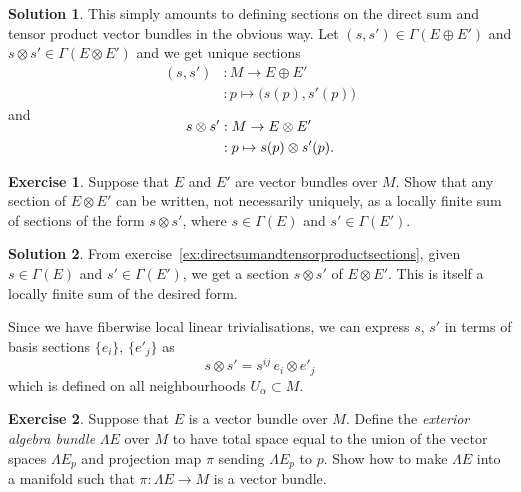 \documentclass[11pt, a4paper]{report}
\theoremstyle{definition}
\newtheorem{exercise}{Exercise}[part]
\newtheorem{solution}{Solution}[part]
\newenvironment{ex}{\begin{exercise}}{\end{exercise}\pagebreak[1]}
\newenvironment{sol}{\begin{solution}}{\end{solution}\pagebreak[3]}
\begin{document}
\begin{sol}

This simply amounts to defining sections on the direct sum and tensor product vector bundles in the obvious way. Let $(s, s') \in \Gamma(E \oplus E')$ and $s \otimes s' \in \Gamma(E \otimes E')$ and we get unique sections
\begin{align*}
    (s, s') &: M \to E \oplus E' \\
            &: p \mapsto \bigl(s(p), s'(p)\bigr)
\end{align*}
and
\begin{align*}
    \SwapAboveDisplaySkip
    s \otimes s' &: M \to E \otimes E' \\
                 &: p \mapsto s(p) \otimes s'(p).
\end{align*}

\end{sol}

\begin{ex}

Suppose that $E$ and $E'$ are vector bundles over $M$.
Show that any section of $E \otimes E'$ can be written, not necessarily uniquely, as a locally finite sum of sections of the form $s \otimes s'$, where $s \in \Gamma(E)$ and $s' \in \Gamma(E')$.

\end{ex}

\begin{sol}

From exercise~\ref{ex:directsumandtensorproductsections}, given $s \in \Gamma(E)$ and $s' \in \Gamma(E')$, we get a section $s \otimes s'$ of $E \otimes E'$. This is itself a locally finite sum of the desired form.

Since we have fiberwise local linear trivialisations, we can express $s$, $s'$ in terms of basis sections $\{e_i\}$, $\{e'_j\}$ as
\[
    s \otimes s' = s^{ij} \, e_i \otimes e'_j
\]
which is defined on all neighbourhoods $U_\alpha \subset M$.

\end{sol}

\begin{ex}

Suppose that $E$ is a vector bundle over $M$.
Define the \emph{exterior algebra bundle} $\Lambda E$ over $M$ to have total space equal to the union of the vector spaces $\Lambda E_p$ and projection map $\pi$ sending $\Lambda E_p$ to $p$.
Show how to make $\Lambda E$ into a manifold such that $\pi: \Lambda E \to M$ is a vector bundle.

\end{ex}
\end{document}
